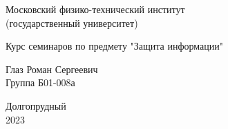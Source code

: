 


\begin{titlepage}

    \newpage
    \begin{center}
        \normalsize Московский физико-технический институт \\
                         (государственный университет)
    \end{center}

    \vspace{6em}

    \begin{center}
        \Large Курс семинаров по предмету "Защита информации"\\
        \articleTopic
    \end{center}

    \vspace{1em}

    \begin{center}
        \Large \textbf{\articleName}
    \end{center}

    \vspace{2em}

    \begin{center}
        \large Глаз Роман Сергеевич\\
               Группа Б01-008а
    \end{center}

    \vspace{\fill}

    \begin{center}
        Долгопрудный \\
            2023
    \end{center}

\end{titlepage}


    \pagestyle{fancy}
    \fancyhead{}
    \fancyfoot[C]{\thepage}
